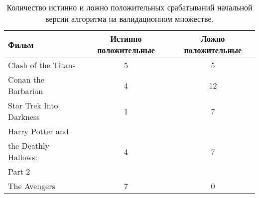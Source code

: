 \begin{table}[!h]
	\centering
	\begin{tabular}[width=\textwidth]{lcc}
		\toprule
		Фильм 									&  Истинно положительные  & Ложно положительные  		 \\\toprule
		Clash of the Titans 			& 5 								 & 5 						   \\\midrule
		Conan the Barbarian 		& 4 								 & 12 						  \\\midrule
		Star Trek Into Darkness   & 1 								    & 7 						  \\\midrule
		Harry Potter and  				&  									   &  							   \\
		the Deathly Hallows: 		 & 4 								   & 7						     \\
		Part 2 									  & 									  & 							 \\\midrule
		The Avengers 					 & 7 									& 0 						 \\\bottomrule
	\end{tabular}
    \caption{Количество истинно и ложно положительных срабатываний начальной 
    	версии алгоритма на валидационном множестве.}
	\label{tab:testsample}
\end{table}
